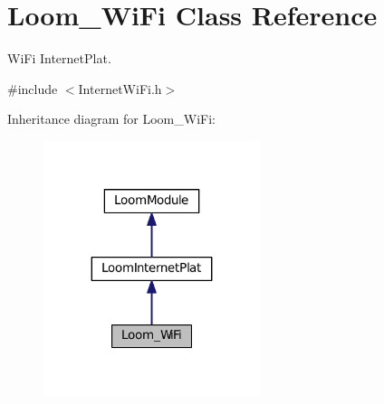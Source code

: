 \hypertarget{class_loom___wi_fi}{}\section{Loom\+\_\+\+Wi\+Fi Class Reference}
\label{class_loom___wi_fi}


Wi\+Fi Internet\+Plat.  




{\ttfamily \#include $<$Internet\+Wi\+Fi.\+h$>$}



Inheritance diagram for Loom\+\_\+\+Wi\+Fi\+:\nopagebreak
\begin{figure}[H]
\begin{center}
\leavevmode
\includegraphics[width=179pt]{class_loom___wi_fi__inherit__graph}
\end{center}
\end{figure}
